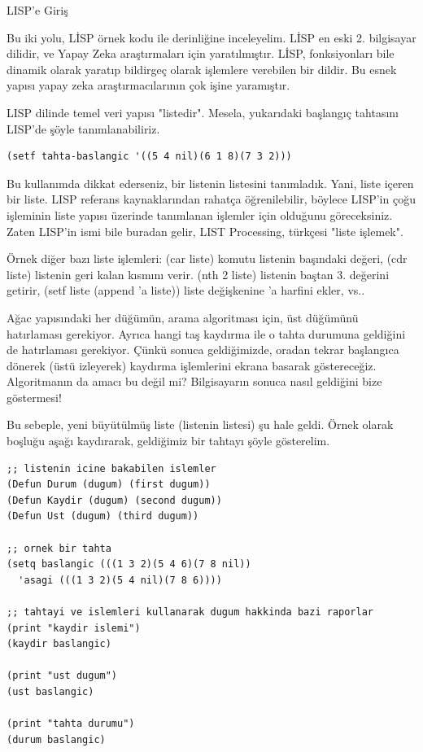 \documentclass[12pt,fleqn]{article}\usepackage{../../common}
\begin{document}
LISP'e Giriş

Bu iki yolu, LİSP örnek kodu ile derinliğine inceleyelim. LİSP en eski
2. bilgisayar dilidir, ve Yapay Zeka araştırmaları için
yaratılmıştır. LİSP, fonksiyonları bile dinamik olarak yaratıp bildirgeç olarak
işlemlere verebilen bir dildir. Bu esnek yapısı yapay zeka
araştırmacılarının çok işine yaramıştır.

LISP dilinde temel veri yapısı "listedir". Mesela, yukarıdaki başlangıç
tahtasını LISP'de şöyle tanımlanabiliriz.

\begin{verbatim}
(setf tahta-baslangic '((5 4 nil)(6 1 8)(7 3 2)))
\end{verbatim}

Bu kullanımda dikkat ederseniz, bir listenin listesini tanımladık. Yani,
liste içeren bir liste. LISP referans kaynaklarından rahatça öğrenilebilir,
böylece LISP'in çoğu işleminin liste yapısı üzerinde tanımlanan işlemler
için olduğunu göreceksiniz. Zaten LISP'in ismi bile buradan gelir, LIST
Processing, türkçesi "liste işlemek".

Örnek diğer bazı liste işlemleri: (car liste) komutu listenin başındaki
değeri, (cdr liste) listenin geri kalan kısmını verir. (nth 2 liste)
listenin baştan 3. değerini getirir, (setf liste (append 'a liste)) liste
değişkenine 'a harfini ekler, vs..

Ağac yapısındaki her düğümün, arama algoritması için, üst düğümünü
hatırlaması gerekiyor. Ayrıca hangi taş kaydırma ile o tahta durumuna
geldiğini de hatırlaması gerekiyor. Çünkü sonuca geldiğimizde, oradan
tekrar başlangıca dönerek (üstü izleyerek) kaydırma işlemlerini ekrana
basarak göstereceğiz. Algoritmanın da amacı bu değil mi? Bilgisayarın
sonuca nasıl geldiğini bize göstermesi!

Bu sebeple, yeni büyütülmüş liste (listenin listesi) şu hale geldi. Örnek
olarak boşluğu aşağı kaydırarak, geldiğimiz bir tahtayı şöyle gösterelim.

\begin{verbatim}
;; listenin icine bakabilen islemler
(Defun Durum (dugum) (first dugum))
(Defun Kaydir (dugum) (second dugum))
(Defun Ust (dugum) (third dugum))

;; ornek bir tahta
(setq baslangic (((1 3 2)(5 4 6)(7 8 nil)) 
  'asagi (((1 3 2)(5 4 nil)(7 8 6))))

;; tahtayi ve islemleri kullanarak dugum hakkinda bazi raporlar
(print "kaydir islemi")
(kaydir baslangic)

(print "ust dugum")
(ust baslangic)

(print "tahta durumu")
(durum baslangic)
\end{verbatim}
\end{document}
